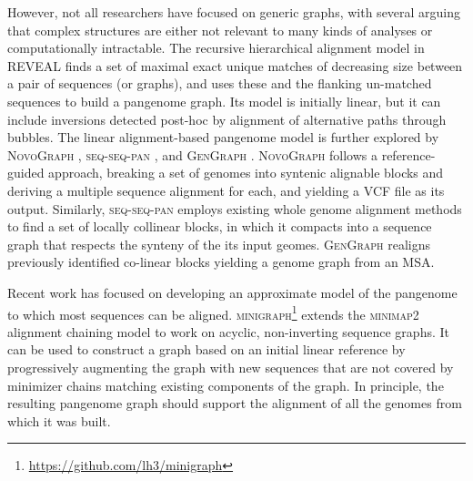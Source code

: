 However, not all researchers have focused on generic graphs, with several arguing that complex structures are either not relevant to many kinds of analyses or computationally intractable. %
The recursive hierarchical alignment model in \textsc{REVEAL} \cite{linthorst2015scalable} finds a set of maximal exact unique matches of decreasing size between a pair of sequences (or graphs), and uses these and the flanking un-matched sequences to build a pangenome graph.
Its model is initially linear, but it can include inversions detected post-hoc by alignment of alternative paths through bubbles.
The linear alignment-based pangenome model is further explored by \textsc{NovoGraph} \cite{Biederstedt2018}, \textsc{seq-seq-pan} \cite{Jandrasits_2018}, and \textsc{GenGraph} \cite{Ambler_2019}.
\textsc{NovoGraph} follows a reference-guided approach, breaking a set of genomes into syntenic alignable blocks and deriving a multiple sequence alignment for each, and yielding a VCF file as its output.
Similarly, \textsc{seq-seq-pan} employs existing whole genome alignment methods to find a set of locally collinear blocks, in which it compacts into a sequence graph that respects the synteny of the its input geomes.
\textsc{GenGraph} realigns previously identified co-linear blocks yielding a genome graph from an MSA.

Recent work has focused on developing an approximate model of the pangenome to which most sequences can be aligned.
\textsc{minigraph}\footnote{\url{https://github.com/lh3/minigraph}} extends the \textsc{minimap2} \cite{Li_2018} alignment chaining model to work on acyclic, non-inverting sequence graphs.
It can be used to construct a graph based on an initial linear reference by progressively augmenting the graph with new sequences that are not covered by minimizer chains matching existing components of the graph.
In principle, the resulting pangenome graph should support the alignment of all the genomes from which it was built.

